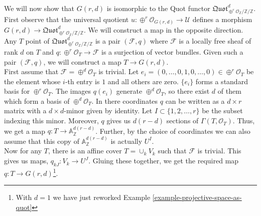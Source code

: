 \documentclass[ignorenonframetext,t]{beamer}
\newcommand{\sF}{{\mathcal F}}
\newcommand{\sO}{{\mathcal O}}
\newcommand{\sU}{{\mathcal U}}
\newcommand{\A}{{\mathbb A}}
\newcommand{\Z}{{\mathbb Z}}
\theoremstyle{definition}
\begin{document}
\begin{example}
	\label{example-grassmannian-as-quot}
	We will now show that $G(r,d)$ is isomorphic to the Quot functor $\mathfrak{Quot}^d_{\oplus^r\sO_\Z/\Z/\Z}$. First observe that the universal quotient $u: \oplus^r \sO_{G(r,d)}\rightarrow \sU$ defines a morphism $G(r,d)\rightarrow \mathfrak{Quot}^d_{\oplus^r\sO_\Z/\Z/\Z}$. We will construct a map in the opposite direction.\\
	Any $T$ point of $\mathfrak{Quot}^d_{\oplus^r\sO_\Z/\Z/\Z}$ is a pair $(\sF,q)$ where $\sF$ is a locally free sheaf of rank $d$ on $T$ and $q: \oplus^r \sO_T\rightarrow \sF$ is a surjection of vector bundles. Given such a pair $(\sF,q)$, we will construct a map $T\rightarrow G(r,d)$.\\
	First assume that $\sF=\oplus^d \sO_T$ is trivial. Let $e_i=(0,\ldots,0,1,0,\ldots,0)\in \oplus^r \sO_T$ be the element whose $i$-th entry is $1$ and all others are zero. $\{e_i\}$ forms a standard basis for $\oplus^r \sO_T$. The images $q(e_i)$ generate $\oplus^d \sO_T$, so there exist $d$ of them which form a basis of $\oplus^d \sO_T$. In there coordinates $q$ can be written as a $d\times r$ matrix with a $d\times d$-minor given by identity. Let $I\subset \{1,2,\ldots,r\}$ be the subset indexing this minor. Moreover, $q$ gives us $d(r-d)$ sections of $\Gamma(T,\sO_T)$. Thus, we get a map $q: T\rightarrow \A^{d(r-d)}_\Z$. Further, by the choice of coordinates we can also assume that this copy of $\A^{d(r-d)}_\Z$ is actually $U^I$.\\
	Now for any $T$, there is an affine cover $T=\cup_k V_k$ such that $\sF$ is trivial. This gives us maps, $q_{kJ}: V_k\rightarrow U^J$. Gluing these together, we get the required map $q: T\rightarrow G(r,d)$\footnote{With $d=1$ we have just reworked Example \ref{example-projective-space-as-quot}}.
\end{example}
\end{document}
